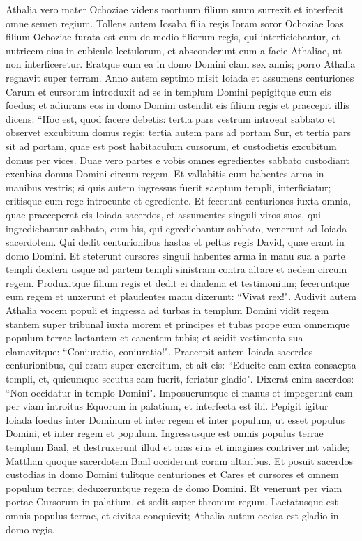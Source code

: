 \begin{biblechapter}  
\verse Athalia vero mater Ochoziae videns mortuum filium suum surrexit et interfecit omne semen regium. 
\verse Tollens autem Iosaba filia regis Ioram soror Ochoziae Ioas filium Ochoziae furata est eum de medio filiorum regis, qui interficiebantur, et nutricem eius in cubiculo lectulorum, et absconderunt eum a facie Athaliae, ut non interficeretur. 
\verse Eratque cum ea in domo Domini clam sex annis; porro Athalia regnavit super terram. 
\verse Anno autem septimo misit Ioiada et assumens centuriones Carum et cursorum introduxit ad se in templum Domini pepigitque cum eis foedus; et adiurans eos in domo Domini ostendit eis filium regis 
\verse et praecepit illis dicens: “Hoc est, quod facere debetis: tertia pars vestrum introeat sabbato et observet excubitum domus regis; 
\verse tertia autem pars ad portam Sur, et tertia pars sit ad portam, quae est post habitaculum cursorum, et custodietis excubitum domus per vices. 
\verse Duae vero partes e vobis omnes egredientes sabbato custodiant excubias domus Domini circum regem. 
\verse Et vallabitis eum habentes arma in manibus vestris; si quis autem ingressus fuerit saeptum templi, interficiatur; eritisque cum rege introeunte et egrediente. 
\verse Et fecerunt centuriones iuxta omnia, quae praeceperat eis Ioiada sacerdos, et assumentes singuli viros suos, qui ingrediebantur sabbato, cum his, qui egrediebantur sabbato, venerunt ad Ioiada sacerdotem. 
\verse Qui dedit centurionibus hastas et peltas regis David, quae erant in domo Domini. 
\verse Et steterunt cursores singuli habentes arma in manu sua a parte templi dextera usque ad partem templi sinistram contra altare et aedem circum regem. 
\verse Produxitque filium regis et dedit ei diadema et testimonium; feceruntque eum regem et unxerunt et plaudentes manu dixerunt: “Vivat rex!". 
\verse Audivit autem Athalia vocem populi et ingressa ad turbas in templum Domini  
\verse vidit regem stantem super tribunal iuxta morem et principes et tubas prope eum omnemque populum terrae laetantem et canentem tubis; et scidit vestimenta sua clamavitque: “Coniuratio, coniuratio!". 
\verse Praecepit autem Ioiada sacerdos centurionibus, qui erant super exercitum, et ait eis: “Educite eam extra consaepta templi, et, quicumque secutus eam fuerit, feriatur gladio". Dixerat enim sacerdos: “Non occidatur in templo Domini".  
\verse Imposueruntque ei manus et impegerunt eam per viam introitus Equorum in palatium, et interfecta est ibi. 
\verse Pepigit igitur Ioiada foedus inter Dominum et inter regem et inter populum, ut esset populus Domini, et inter regem et populum. 
\verse Ingressusque est omnis populus terrae templum Baal, et destruxerunt illud et aras eius et imagines contriverunt valide; Matthan quoque sacerdotem Baal occiderunt coram altaribus. Et posuit sacerdos custodias in domo Domini 
\verse tulitque centuriones et Cares et cursores et omnem populum terrae; deduxeruntque regem de domo Domini. Et venerunt per viam portae Cursorum in palatium, et sedit super thronum regum.  
\verse Laetatusque est omnis populus terrae, et civitas conquievit; Athalia autem occisa est gladio in domo regis. 
\end{biblechapter}

